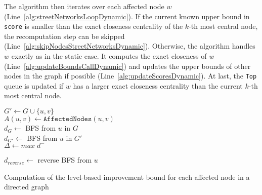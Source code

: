 The algorithm then iterates over each affected node $w$ (Line~\ref{alg:streetNetworksLoopDynamic}). If the current known upper bound in \texttt{score} is smaller than the exact closeness centrality of the $k$-th most central node, the recomputation step can be skipped (Line~\ref{alg:skipNodesStreetNetworksDynamic}). Otherwise, the algorithm handles $w$ exactly as in the static case. It computes the exact closeness of $w$ (Line~\ref{alg:updateBoundsCallDynamic}) and updates the upper bounds of other nodes in the graph if possible (Line~\ref{alg:updateScoresDynamic}). At last, the \texttt{Top} queue is updated if $w$ has a larger exact closeness centrality than the current $k$-th most central node.

\begin{algorithm2e}[h!]
 \label{alg:levelBasedImprovementBounds}
 
 $G' \gets G \cup \{u, v\} $ \\
 $A(u, v) \gets \texttt{AffectedNodes}(u, v)$ \\
 $d_{G} \gets $ BFS from $u$ in $G$ \\
 $d_{G'} \gets $ BFS from $u$ in $G'$ \\
 $\Delta \gets max\;d^-$
 
 
 
 $d_{reverse} \gets $ reverse BFS from $u$
 

 \caption{Computation of the level-based improvement bound for each affected node in a directed graph}
\end{algorithm2e}

